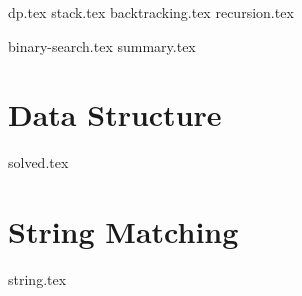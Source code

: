 \documentclass{../latex-setting/cmemoir}
\begin{document}

\frontmatter

\tableofcontents

\restoregeometry%

\mainmatter{}


{dp.tex}
{stack.tex}
{backtracking.tex}
{recursion.tex}

{binary-search.tex}
{summary.tex}



\part{Data Structure}

{solved.tex}

\part{String Matching}
{string.tex}
% 
\end{document}
